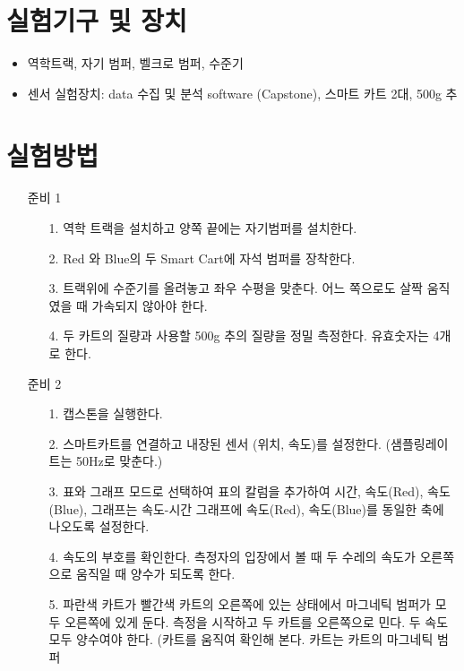 \documentclass[12pt,a4paper]{article}
\begin{document}
\section{실험기구 및 장치}
\begin{itemize}
    \item 역학트랙, 자기 범퍼, 벨크로 범퍼, 수준기
    \item 센서 실험장치: data 수집 및 분석 software (Capstone),
        스마트 카트 2대, 500g 추
\end{itemize}
\section{실험방법}
\begin{enumerate}
    \item [준비 1]
        \begin{enumerate}
            \item [1.] 역학 트랙을 설치하고 양쪽 끝에는 자기범퍼를 설치한다.
            \item [2.] Red 와 Blue의 두 Smart Cart에 자석 범퍼를 장착한다.
            \item [3.] 트랙위에 수준기를 올려놓고 좌우 수평을 맞춘다.
                어느 쪽으로도 살짝 움직였을 때 가속되지 않아야 한다.
            \item [4.] 두 카트의 질량과 사용할 500g 추의 질량을 정밀 측정한다.
                유효숫자는 4개로 한다.
        \end{enumerate}
    \item [준비 2]
        \begin{enumerate}
            \item [1.] 캡스톤을 실행한다.
            \item [2.] 스마트카트를 연결하고 내장된 센서 (위치, 속도)를 설정한다.
                (샘플링레이트는 50Hz로 맞춘다.)
            \item [3.] 표와 그래프 모드로 선택하여 표의 칼럼을 추가하여
                시간, 속도(Red), 속도(Blue), 그래프는 속도-시간 그래프에
                속도(Red), 속도(Blue)를 동일한 축에 나오도록 설정한다.
            \item [4.] 속도의 부호를 확인한다. 측정자의 입장에서 볼 때 두 수레의
                속도가 오른쪽으로 움직일 때 양수가 되도록 한다.
            \item [5.] 파란색 카트가 빨간색 카트의 오른쪽에 있는 상태에서
                마그네틱 범퍼가 모두 오른쪽에 있게 둔다.
                측정을 시작하고 두 카트를 오른쪽으로 민다. 두 속도 모두 양수여야
                한다. (카트를 움직여 확인해 본다. 카트는 카트의 마그네틱 범퍼

\end{enumerate}
\end{enumerate}
\end{document}
